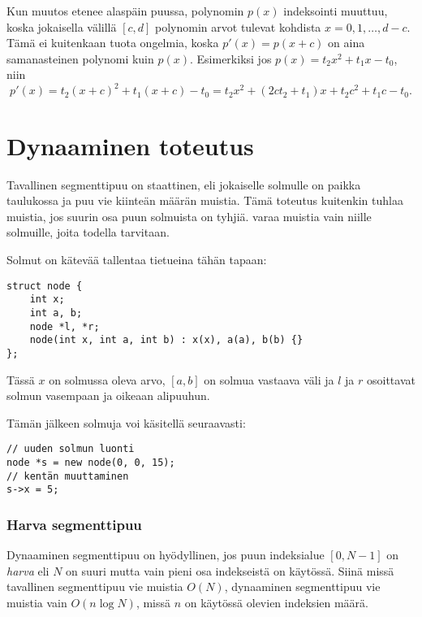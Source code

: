 Kun muutos etenee alaspäin puussa,
polynomin $p(x)$ indeksointi muuttuu,
koska jokaisella välillä $[c,d]$
polynomin arvot tulevat kohdista $x=0,1,\ldots,d-c$.
Tämä ei kuitenkaan tuota ongelmia,
koska $p'(x)=p(x+c)$ on aina
samanasteinen polynomi kuin $p(x)$.
Esimerkiksi jos $p(x)=t_2 x^2+t_1 x-t_0$, niin
\[p'(x)=t_2(x+c)^2+t_1(x+c)-t_0=t_2 x^2 + (2ct_2+t_1)x+t_2c^2+t_1c-t_0.\]

\section{Dynaaminen toteutus}


Tavallinen segmenttipuu on staattinen,
eli jokaiselle solmulle on paikka taulukossa
ja puu vie kiinteän määrän muistia.
Tämä toteutus kuitenkin tuhlaa muistia,
jos suurin osa puun solmuista on tyhjiä.
 varaa muistia vain
niille solmuille, joita todella tarvitaan.

Solmut on kätevää tallentaa tietueina tähän tapaan:

\begin{lstlisting}
struct node {
    int x;
    int a, b;
    node *l, *r;
    node(int x, int a, int b) : x(x), a(a), b(b) {}
};
\end{lstlisting}
Tässä $x$ on solmussa oleva arvo,
$[a,b]$ on solmua vastaava väli
ja $l$ ja $r$ osoittavat
solmun vasempaan ja oikeaan alipuuhun.

Tämän jälkeen solmuja voi käsitellä seuraavasti:

\begin{lstlisting}
// uuden solmun luonti
node *s = new node(0, 0, 15);
// kentän muuttaminen
s->x = 5;
\end{lstlisting}

\subsubsection{Harva segmenttipuu}


Dynaaminen segmenttipuu on hyödyllinen,
jos puun indeksialue $[0,N-1]$ on \textit{harva}
eli $N$ on suuri mutta vain
pieni osa indekseistä on käytössä.
Siinä missä tavallinen segmenttipuu 
vie muistia $O(N)$,
dynaaminen segmenttipuu vie muistia
vain $O(n \log N)$, missä $n$ on
käytössä olevien indeksien määrä.

